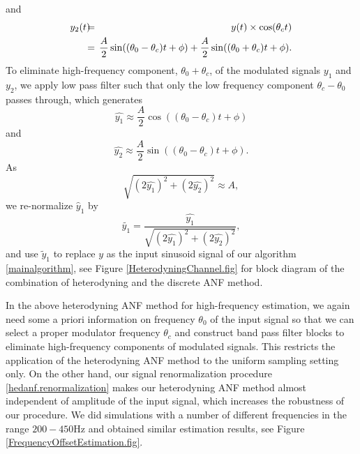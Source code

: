 \documentclass{UCF_ETD}
\begin{document}
and
\begin{eqnarray*}
y_2(t) &\hskip-0.08in =& \hskip-0.08in y(t) \times \cos (\theta_c t)  \nonumber \\
&\hskip-0.08in =& \hskip-0.08in \frac{A}{2}  \sin ((\theta_0-\theta_c)  t+\phi) +\frac{A}{2}  \sin (
(\theta_0 + \theta_c) t+\phi). \nonumber
\end{eqnarray*}
To  eliminate  high-frequency component, $\theta_0+\theta_c$, of the modulated signals $y_1$ and $y_2$,
we apply low pass filter such that only the low frequency component $\theta_c-\theta_0$ passes through,
 which generates
$$
 \widehat{y_1}  \approx  \frac{A}{2}  \cos ((\theta_0-\theta_c)  t+\phi)$$
 and
$$ \widehat{y_2}  \approx  \frac{A}{2}\sin ((\theta_0-\theta_c)  t+\phi). $$
As
$$
\sqrt {(2\widehat{y_1})^2+ (2\widehat{y_2})^2}\approx A,
$$
we re-normalize $\widehat y_1$ by
\begin{equation}\label{hedanf.renormalization}
 \tilde {y_1} = \frac{\widehat{y_1}}{\sqrt {(2\widehat{y_1})^2+ (2\widehat{y_2})^2}},\end{equation}
and use $\tilde y_1$  to replace $y$ as the input sinusoid signal
of our  algorithm \eqref{mainalgorithm},
   see
 Figure \ref{HeterodyningChannel.fig} for block diagram of the  combination of
  heterodyning and the discrete ANF method.


In the above  heterodyning ANF method for high-frequency estimation,
 we again need some a priori information on
frequency $\theta_0$ of the input signal so that we can select a proper modulator frequency $\theta_c$
and  construct band pass filter blocks to
 eliminate high-frequency components of modulated signals. This
 restricts the application of the  heterodyning ANF method to the uniform sampling setting only.
On the other hand,  our signal renormalization  procedure \eqref{hedanf.renormalization}
 makes our  heterodyning ANF method almost independent of amplitude of the input signal, which
 increases the robustness of our procedure.
 We did simulations with a number of different frequencies in the range $200- 450$Hz and obtained similar estimation results, see Figure \ref{FrequencyOffsetEstimation.fig}. %








\end{document}
